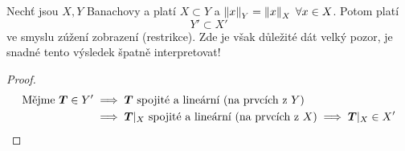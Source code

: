\begin{lemma}
    Nechť jsou $X,Y$ Banachovy a platí $X \subset Y$ a $\left\lVert x\right\rVert_Y = \left\lVert x\right\rVert_X \; \forall x \in X$. Potom platí $$Y' \subset X'$$ ve smyslu zúžení zobrazení (restrikce). Zde je však důležité dát velký pozor, je snadné tento výsledek špatně interpretovat!
\end{lemma}
\begin{proof}
    \begin{align*}
    \text{Mějme } \boldsymbol{T} \in Y'
    &\implies
    \boldsymbol{T} \text{ spojité a lineární (na prvcích z $Y$) }
    \\
    &\implies
    \boldsymbol{T}|_X \text{ spojité a lineární (na prvcích z $X$)}
    \implies
    \boldsymbol{T}|_X \in X'
    \end{align*}
\end{proof}

